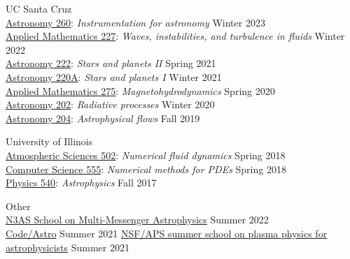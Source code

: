 \documentclass{cv}
\begin{document}
UC Santa Cruz\\
\href{https://catalog.ucsc.edu/Current/General-Catalog/Courses/ASTR-Astronomy-and-Astrophysics/200/ASTR-260}{Astronomy 260}: \textit{Instrumentation for astronomy} \hfill Winter 2023\\
\href{https://catalog.ucsc.edu/en/Current/General-Catalog/Courses/AM-Applied-Mathematics/Graduate/AM-227}{Applied Mathematics 227}: \textit{Waves, instabilities, and turbulence in fluids} \hfill Winter 2022\\
\href{https://catalog.ucsc.edu/Current/General-Catalog/Courses/ASTR-Astronomy-and-Astrophysics/200/ASTR-222}{Astronomy 222}: \textit{Stars and planets II} \hfill Spring 2021\\
\href{https://catalog.ucsc.edu/Current/General-Catalog/Courses/ASTR-Astronomy-and-Astrophysics/200/ASTR-220A}{Astronomy 220A}: \textit{Stars and planets I} \hfill Winter 2021\\
\href{https://catalog.ucsc.edu/en/Current/General-Catalog/Courses/AM-Applied-Mathematics/Graduate/AM-275}{Applied Mathematics 275}: \textit{Magnetohydrodynamics} \hfill Spring 2020\\
\href{https://catalog.ucsc.edu/en/Current/General-Catalog/Courses/ASTR-Astronomy-and-Astrophysics/200/ASTR-202}{Astronomy 202}: \textit{Radiative processes} \hfill Winter 2020\\
\href{https://catalog.ucsc.edu/en/Current/General-Catalog/Courses/ASTR-Astronomy-and-Astrophysics/200/ASTR-204}{Astronomy 204}: \textit{Astrophysical flows} \hfill Fall 2019

University of Illinois\\
\href{https://courses.illinois.edu/schedule/2018/spring/ATMS/502}{Atmospheric Sciences 502}: \textit{Numerical fluid dynamics} \hfill Spring 2018\\
\href{https://cs.illinois.edu/academics/courses/cs555}{Computer Science 555}: \textit{Numerical methods for PDEs} \hfill Spring 2018\\
\href{https://physics.illinois.edu/academics/courses/profile/PHYS\%20540}{Physics 540}: \textit{Astrophysics} \hfill Fall 2017

Other\\
\href{https://n3as.berkeley.edu/events/summer-school/}{N3AS School on Multi-Messenger Astrophysics} \hfill Summer 2022\\
\href{https://semaphorep.github.io/codeastro/}{Code/Astro} \hfill Summer 2021
\href{https://www.gpapschool.com/}{NSF/APS summer school on plasma physics for astrophysicists} \hfill Summer 2021
\else\fi
\end{document}
